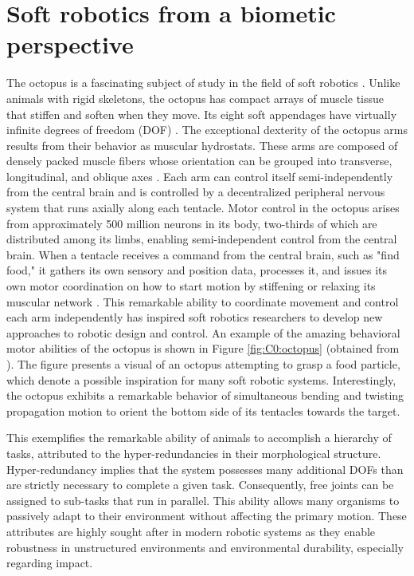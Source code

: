 \section{Soft robotics from a biometic perspective}
The octopus is a fascinating subject of study in the field of soft robotics \cite{Renda2018,Wehner2016,Kim2019Aug,Laschi2014,Rus2015,Mochiyama1999,Chang2022}. Unlike animals with rigid skeletons, the octopus has compact arrays of muscle tissue that stiffen and soften when they move. Its eight soft appendages have virtually infinite degrees of freedom (DOF) \cite{Sumbre2001Sep,Kier1985,Kennedy2020Nov}. The exceptional dexterity of the octopus arms results from their behavior as muscular hydrostats. These arms are composed of densely packed muscle fibers whose orientation can be grouped into transverse, longitudinal, and oblique axes \cite{Kier2007Oct}. Each arm can control itself semi-independently from the central brain and is controlled by a decentralized peripheral nervous system that runs axially along each tentacle. Motor control in the octopus arises from approximately 500 million neurons in its body, two-thirds of which are distributed among its limbs, enabling semi-independent control from the central brain. When a tentacle receives a command from the central brain, such as "find food," it gathers its own sensory and position data, processes it, and issues its own motor coordination on how to start motion by stiffening or relaxing its muscular network \cite{Kier1985,Sumbre2001Sep}. This remarkable ability to coordinate movement and control each arm independently has inspired soft robotics researchers to develop new approaches to robotic design and control. An example of the amazing behavioral motor abilities of the octopus is shown in Figure \ref{fig:C0:octopus} (obtained from \cite{Sumbre2001Sep}). The figure presents a visual of an octopus attempting to grasp a food particle, which denote a possible inspiration for many soft robotic systems. Interestingly, the octopus exhibits a remarkable behavior of simultaneous bending and twisting propagation motion to orient the bottom side of its tentacles towards the target. 

This exemplifies the remarkable ability of animals to accomplish a hierarchy of tasks, attributed to the hyper-redundancies in their morphological structure. Hyper-redundancy \cite{Chirikjian1989,Chirikjian1991,Rus2015} implies that the system possesses many additional DOFs than are strictly necessary to complete a given task. Consequently, free joints can be assigned to sub-tasks that run in parallel. This ability allows many organisms to passively adapt to their environment without affecting the primary motion. These attributes are highly sought after in modern robotic systems \cite{Spong1996,Murray1994,DeLuca2016Jul} as they enable robustness in unstructured environments and environmental durability, especially regarding impact.

